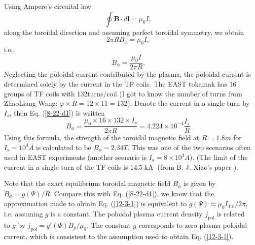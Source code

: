 \documentclass{llncs}
\newcommand{\tmop}[1]{\ensuremath{\operatorname{#1}}}
\begin{document}
Using Ampere's circuital law
\begin{equation}
  \label{9-5-8} \oint \mathbf{B} \cdot d\mathbf{l}= \mu_0 I,
\end{equation}
along the toroidal direction and assuming perfect toroidal symmetry, we obtain
\begin{equation}
  2 \pi R B_{\phi} = \mu_0 I,
\end{equation}
i.e.,
\begin{equation}
  \label{8-22-d1} B_{\phi} = \frac{\mu_0 I}{2 \pi R} .
\end{equation}
Neglecting the poloidal current contributed by the plasma, the poloidal
current is determined solely by the current in the TF coils. The EAST tokamak
has 16 groups of TF coils with 132turns/coil (I got to know the number of
turns from ZhaoLiang Wang: $\varphi \times R = 12 \times 11 = 132$). Denote
the current in a single turn by $I_s$, then Eq. (\ref{8-22-d1}) is written
\begin{equation}
  \label{12-3-1} B_{\phi} = \frac{\mu_0 \times 16 \times 132 \times I_s}{2 \pi
  R} = 4.224 \times 10^{- 4} \frac{I_s}{R}
\end{equation}
Using this formula, the strength of the toroidal magnetic field at $R = 1.8 m$
for $I_s = 10^4 A$ is calculated to be $B_{\phi} = 2.34 T$. This was one of
the two scenarios often used in EAST experiments (another scenario is $I_s = 8
\times 10^3 A$). (The limit of the current in a single turn of the TF coils is
$14.5 \tmop{kA}$ (from B. J. Xiao's paper {\cite{xiao2008}}).

Note that the exact equilibrium toroidal magnetic field $B_{\phi}$ is given by
$B_{\phi} = g (\Psi) / R$. Compare this with Eq. (\ref{8-22-d1}), we know that
the approximation made to obtain Eq. (\ref{12-3-1}) is equivalent to $g (\Psi)
\approx \mu_0 I_{\tmop{TF}} / 2 \pi$, i.e. assuming $g$ is a constant. The
poloidal plasma current density $j_{\tmop{pol}}$ is related to $g$ by
$j_{\tmop{pol}} = g' (\Psi) B_p / \mu_0$. The constant $g$ corresponds to zero
plasma poloidal current, which is consistent to the assumption used to obtain
Eq. (\ref{12-3-1}).
\end{document}
